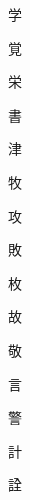 \begin{spacing}{2.5}
{\Huge \begin{CJK}{UTF8}{min} 学\end{CJK}}\hspace{0.1cm}
{\Huge \begin{CJK}{UTF8}{min} 覚\end{CJK}}\hspace{0.1cm}
{\Huge \begin{CJK}{UTF8}{min} 栄\end{CJK}}\hspace{0.1cm}
{\Huge \begin{CJK}{UTF8}{min} 書\end{CJK}}\hspace{0.1cm}
{\Huge \begin{CJK}{UTF8}{min} 津\end{CJK}}\hspace{0.1cm}
{\Huge \begin{CJK}{UTF8}{min} 牧\end{CJK}}\hspace{0.1cm}
{\Huge \begin{CJK}{UTF8}{min} 攻\end{CJK}}\hspace{0.1cm}
{\Huge \begin{CJK}{UTF8}{min} 敗\end{CJK}}\hspace{0.1cm}
{\Huge \begin{CJK}{UTF8}{min} 枚\end{CJK}}\hspace{0.1cm}
{\Huge \begin{CJK}{UTF8}{min} 故\end{CJK}}\hspace{0.1cm}
{\Huge \begin{CJK}{UTF8}{min} 敬\end{CJK}}\hspace{0.1cm}
{\Huge \begin{CJK}{UTF8}{min} 言\end{CJK}}\hspace{0.1cm}
{\Huge \begin{CJK}{UTF8}{min} 警\end{CJK}}\hspace{0.1cm}
{\Huge \begin{CJK}{UTF8}{min} 計\end{CJK}}\hspace{0.1cm}
{\Huge \begin{CJK}{UTF8}{min} 詮\end{CJK}}\hspace{0.1cm}

\end{spacing}
